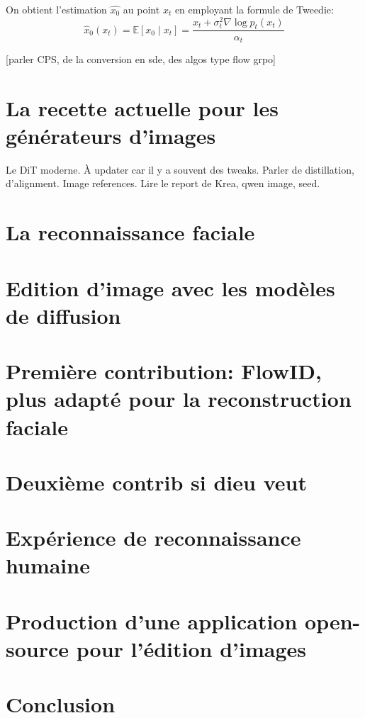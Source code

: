 \documentclass[12pt,a4paper,oneside]{book} %
\begin{document}
On obtient l'estimation $\hat{x_0}$ au point $x_t$ en employant la formule de Tweedie:
\begin{equation}
    \hat{x}_0(x_t) = \mathbb{E}\left[x_0 \mid x_t\right]
    = \frac{x_t + \sigma_t^2 \nabla \log p_t(x_t)}{\alpha_t}
\end{equation}

[parler CPS, de la conversion en sde, des algos type flow grpo]

\chapter{La recette actuelle pour les générateurs d'images}

Le DiT moderne. À updater car il y a souvent des tweaks.
Parler de distillation, d'alignment. Image references. Lire le report de Krea, qwen image, seed.

\chapter{La reconnaissance faciale}

\chapter{Edition d'image avec les modèles de diffusion}

\chapter{Première contribution: FlowID, plus adapté pour la reconstruction faciale}

\chapter{Deuxième contrib si dieu veut}

\chapter{Expérience de reconnaissance humaine}

\chapter{Production d'une application open-source pour l'édition d'images}

\chapter{Conclusion}
\end{document}
